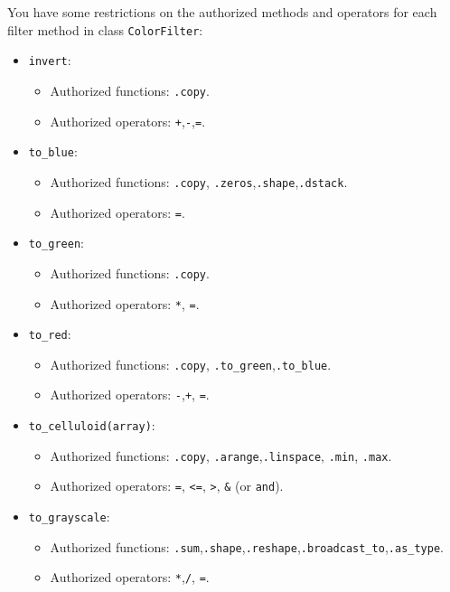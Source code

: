 \documentclass{42-en}
\begin{document}
You have some restrictions on the authorized methods and operators
for each filter method in class \texttt{ColorFilter}:
\begin{itemize}
  \item \texttt{invert}:
  \begin{itemize}
    \item Authorized functions: \texttt{.copy}.
    \item Authorized operators: \texttt{+},\texttt{-},\texttt{=}.
  \end{itemize}
  \item \texttt{to\_blue}:
  \begin{itemize}
    \item Authorized functions: \texttt{.copy}, \texttt{.zeros},\texttt{.shape},\texttt{.dstack}.
    \item Authorized operators: \texttt{=}.
  \end{itemize}
  \item \texttt{to\_green}:
  \begin{itemize}
    \item Authorized functions: \texttt{.copy}.
    \item Authorized operators: \texttt{*}, \texttt{=}.
  \end{itemize}
  \item \texttt{to\_red}:
  \begin{itemize}
    \item Authorized functions: \texttt{.copy}, \texttt{.to\_green},\texttt{.to\_blue}.
    \item Authorized operators: \texttt{-},\texttt{+}, \texttt{=}.
  \end{itemize}
  \item \texttt{to\_celluloid(array)}:
  \begin{itemize}
    \item Authorized functions: \texttt{.copy}, \texttt{.arange},\texttt{.linspace}, \texttt{.min}, \texttt{.max}.
    \item Authorized operators: \texttt{=}, \texttt{<=}, \texttt{>}, \texttt{&} (or \texttt{and}).
  \end{itemize}
  \item \texttt{to\_grayscale}:
  \begin{itemize}
    \item Authorized functions: \texttt{.sum},\texttt{.shape},\texttt{.reshape},\texttt{.broadcast\_to},\texttt{.as\_type}.
    \item Authorized operators: \texttt{*},\texttt{/}, \texttt{=}.
  \end{itemize}
\end{itemize}
\end{document}
